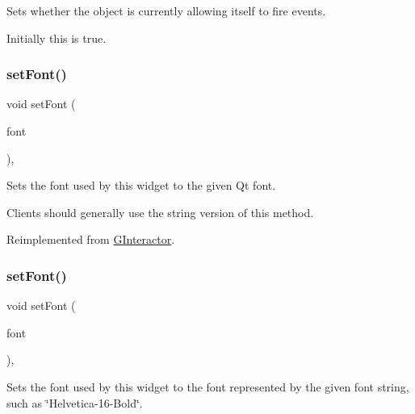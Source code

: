 Sets whether the object is currently allowing itself to fire events. 

Initially this is true. \mbox{\label{classsgl_1_1GLabel_ad1d75b3840a41ba7d1e8a921696dc684}} 
\subsubsection{\texorpdfstring{set\+Font()}{setFont()}\hspace{0.1cm}{\footnotesize\ttfamily [1/2]}}
{\footnotesize\ttfamily void set\+Font (\begin{DoxyParamCaption}\item[{const Q\+Font \&}]{font }\end{DoxyParamCaption})\hspace{0.3cm}{\ttfamily [override]}, {\ttfamily [virtual]}}



Sets the font used by this widget to the given Qt font. 

Clients should generally use the string version of this method. 

Reimplemented from \mbox{\hyperlink{classsgl_1_1GInteractor_a2592348886ffea646c6534bf88f7c49d}{G\+Interactor}}.

\mbox{\label{classsgl_1_1GLabel_a51367c9fd2709973b1f7238734f93891}} 
\subsubsection{\texorpdfstring{set\+Font()}{setFont()}\hspace{0.1cm}{\footnotesize\ttfamily [2/2]}}
{\footnotesize\ttfamily void set\+Font (\begin{DoxyParamCaption}\item[{const std\+::string \&}]{font }\end{DoxyParamCaption})\hspace{0.3cm}{\ttfamily [override]}, {\ttfamily [virtual]}}



Sets the font used by this widget to the font represented by the given font string, such as \char`\"{}\+Helvetica-\/16-\/\+Bold\char`\"{}. 


